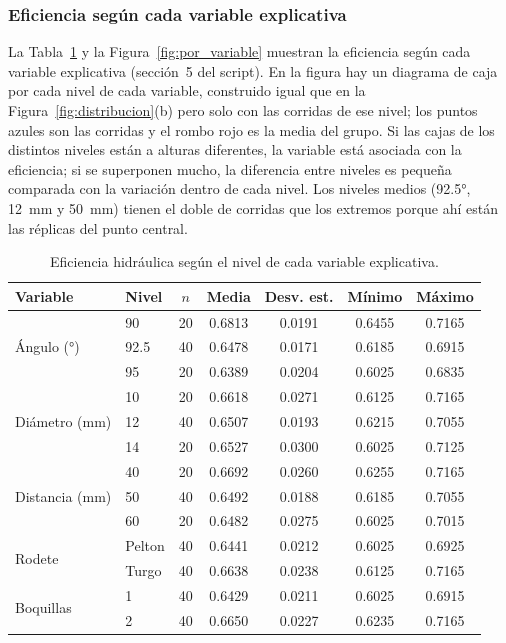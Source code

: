\subsubsection{Eficiencia según cada variable explicativa}

La Tabla~\ref{tab:niveles} y la Figura~\ref{fig:por_variable} muestran la eficiencia según cada variable explicativa (sección~5 del script). En la figura hay un diagrama de caja por cada nivel de cada variable, construido igual que en la Figura~\ref{fig:distribucion}(b) pero solo con las corridas de ese nivel; los puntos azules son las corridas y el rombo rojo es la media del grupo. Si las cajas de los distintos niveles están a alturas diferentes, la variable está asociada con la eficiencia; si se superponen mucho, la diferencia entre niveles es pequeña comparada con la variación dentro de cada nivel. Los niveles medios (92.5°, 12~mm y 50~mm) tienen el doble de corridas que los extremos porque ahí están las réplicas del punto central.

\begin{table}[ht]
\centering
\caption{Eficiencia hidráulica según el nivel de cada variable explicativa.}
\label{tab:niveles}
\begin{tabular}{llccccc}
\toprule
Variable & Nivel & $n$ & Media & Desv. est. & Mínimo & Máximo \\
\midrule
\multirow{3}{*}{Ángulo (°)}       & 90    & 20 & 0.6813 & 0.0191 & 0.6455 & 0.7165 \\
                                  & 92.5  & 40 & 0.6478 & 0.0171 & 0.6185 & 0.6915 \\
                                  & 95    & 20 & 0.6389 & 0.0204 & 0.6025 & 0.6835 \\
\midrule
\multirow{3}{*}{Diámetro (mm)}    & 10    & 20 & 0.6618 & 0.0271 & 0.6125 & 0.7165 \\
                                  & 12    & 40 & 0.6507 & 0.0193 & 0.6215 & 0.7055 \\
                                  & 14    & 20 & 0.6527 & 0.0300 & 0.6025 & 0.7125 \\
\midrule
\multirow{3}{*}{Distancia (mm)}   & 40    & 20 & 0.6692 & 0.0260 & 0.6255 & 0.7165 \\
                                  & 50    & 40 & 0.6492 & 0.0188 & 0.6185 & 0.7055 \\
                                  & 60    & 20 & 0.6482 & 0.0275 & 0.6025 & 0.7015 \\
\midrule
\multirow{2}{*}{Rodete}           & Pelton & 40 & 0.6441 & 0.0212 & 0.6025 & 0.6925 \\
                                  & Turgo  & 40 & 0.6638 & 0.0238 & 0.6125 & 0.7165 \\
\midrule
\multirow{2}{*}{Boquillas}        & 1     & 40 & 0.6429 & 0.0211 & 0.6025 & 0.6915 \\
                                  & 2     & 40 & 0.6650 & 0.0227 & 0.6235 & 0.7165 \\
\bottomrule
\end{tabular}
\end{table}

